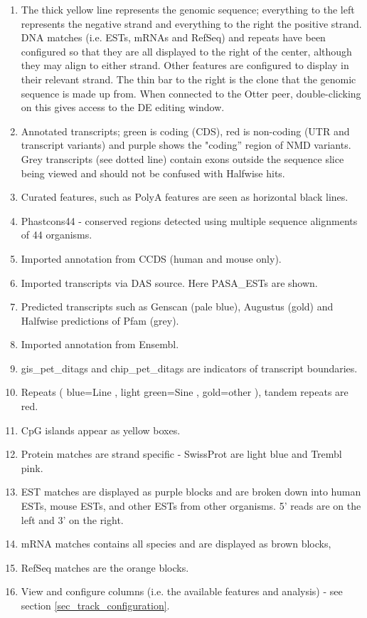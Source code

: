 \documentclass[letterpaper]{article}
\begin{document}
\begin{enumerate}
\item  The thick yellow line represents the genomic sequence; everything to the left represents the negative strand and everything to the right the positive strand. DNA matches (i.e. ESTs, mRNAs and RefSeq) and repeats have been configured so that they are all displayed to the right of the center, although they may align to either strand. Other features are configured to display in their relevant strand. The thin bar to the right is the clone that the genomic sequence is made up from. When connected to the Otter peer, double-clicking on this gives access to the DE editing window.
\item  Annotated transcripts; green is coding (CDS), red is non-coding (UTR and transcript variants) and purple shows the "coding'' region of NMD variants. Grey transcripts (see dotted line) contain exons outside the sequence slice being viewed and should not be confused with Halfwise hits.
\item  Curated features, such as PolyA features are seen as horizontal black lines.
\item  Phastcons44 - conserved regions detected using multiple sequence alignments of 44 organisms.
\item  Imported annotation from CCDS (human and mouse only).
\item  Imported transcripts via DAS source. Here PASA\_ESTs are shown.
\item  Predicted transcripts such as Genscan (pale blue), Augustus (gold) and Halfwise predictions of Pfam (grey).
\item  Imported annotation from Ensembl.
\item  gis\_pet\_ditags and chip\_pet\_ditags are indicators of transcript boundaries.
\item Repeats ( blue=Line , light green=Sine , gold=other ), tandem repeats are red.
\item CpG islands appear as yellow boxes.
\item Protein matches are strand specific - SwissProt are light blue and Trembl pink.
\item EST matches are displayed as purple blocks and are broken down into human ESTs, mouse ESTs, and other ESTs from other organisms. 5' reads are on the left and 3' on the right.
\item mRNA matches contains all species and are displayed as brown blocks,
\item RefSeq matches are the orange blocks.
\item View and configure columns (i.e. the available features and analysis) - see section \ref{sec_track_configuration}.
\end{enumerate}
\end{document}
